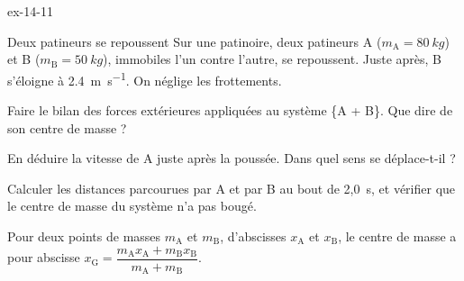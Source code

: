 \begin{blocLivre}{ex-14-11}
\begin{exercice}[2]{Deux patineurs se repoussent}
Sur une patinoire, deux patineurs A ($m_\mathrm{A}=\qty{80}{kg}$) et B ($m_\mathrm{B}=\qty{50}{kg}$), immobiles l'un
contre l'autre, se repoussent. Juste après, B s'éloigne à \qty{2,4}{m.s^{-1}}. On néglige les frottements.
\begin{questions}
\item Faire le bilan des forces extérieures appliquées au système \{A + B\}. Que dire de son centre de masse ?
\item En déduire la vitesse de A juste après la poussée. Dans quel sens se déplace-t-il ?
\item Calculer les distances parcourues par A et par B au bout de 2,0~s, et vérifier que le centre de masse du système
n'a pas bougé.
\end{questions}
\begin{donnees}
Pour deux points de masses $m_\mathrm{A}$ et $m_\mathrm{B}$, d'abscisses $x_\mathrm{A}$ et $x_\mathrm{B}$, le centre de masse a pour abscisse
$x_\mathrm{G}=\dfrac{m_\mathrm{A}x_\mathrm{A}+m_\mathrm{B}x_\mathrm{B}}{m_\mathrm{A}+m_\mathrm{B}}$.
\end{donnees}
\end{exercice}
\end{blocLivre}
